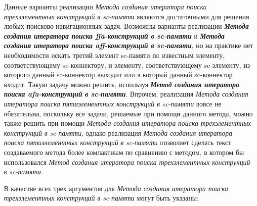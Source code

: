\begin{SCn}
\begin{scnsubstruct}
\begin{scnsubstruct}
\end{scnsubstruct}

\end{scnsubstruct}
\end{SCn}

Данные варианты реализации \textit{Метода создания итератора поиска трехэлементных конструкций в sc-памяти} являются достаточными для решения любых поисково-навигационных задач. Возможны варианты реализации \textbf{\textit{Метода создания итератора поиска ffa-конструкций в sc-памяти}} и \textbf{\textit{Метода создания итератора поиска aff-конструкций в sc-памяти}}, но на практике нет необходимости искать третий элемент sc-памяти по известным элементу, соответствующему sc-коннектору, и элементу, соответствующему sc-элементу, из которого данный sc-коннектор выходит или в который данный sc-коннектор входит. Такую задачу можно решить, используя \textbf{\textit{Метод создания итератора поиска afa-конструкций в sc-памяти}}. Впрочем, реализация \textit{Метода создания итератора поиска пятиэлементных конструкций в sc-памяти} вовсе не обязательна, поскольку все задачи, решаемые при помощи данного метода, можно также решить при помощи \textit{Метода создания итератора поиска трехэлементных конструкций в sc-памяти}, однако реализация \textit{Метода создания итератора поиска пятиэлементных конструкций в sc-памяти} позволяет сделать текст создаваемого метода более компактным по сравнению с методом, в котором бы использовался \textit{Метод создания итератора поиска трехэлементных конструкций в sc-памяти}. 

В качестве всех трех аргументов для \textit{Метода создания итератора поиска трехэлементных конструкций в sc-памяти} могут быть указаны:

